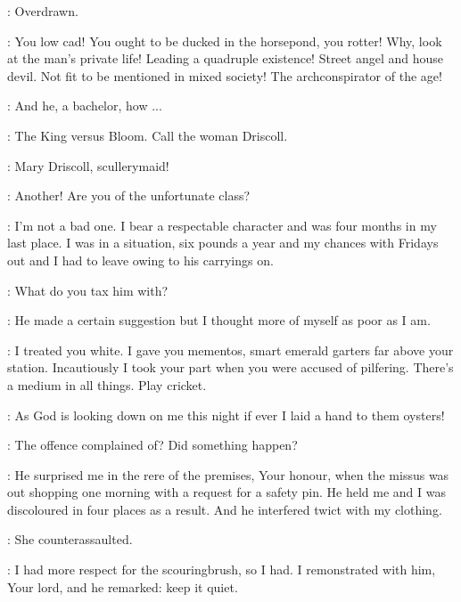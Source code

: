 \Bloom:
 Overdrawn.

\Beaufoy:
You low cad!
You ought to be ducked in the horsepond, you rotter!
Why, look at the man's private life!
Leading a quadruple existence!
Street angel and house devil.
Not fit to be mentioned in mixed society!
The archconspirator of the age!

\Bloom:
And he, a bachelor, how ...

\FirstWatch:
The King versus Bloom.
Call the woman Driscoll.

\Crier:
Mary Driscoll, scullerymaid!


\SecondWatch:
Another!
Are you of the unfortunate class?

\Driscoll:
I'm not a bad one.
I bear a respectable character and was four months in my last place.
I was in a situation, six pounds a year and my chances with Fridays out
and I had to leave owing to his carryings on.

\FirstWatch:
What do you tax him with?

\Driscoll:
He made a certain suggestion
but I thought more of myself as poor as I am.

\Bloom:
I treated you white.
I gave you mementos, smart emerald garters far above your station.
Incautiously I took your part when you were accused of pilfering.
There's a medium in all things.
Play cricket.

\Driscoll:
As God is looking down on me this night if ever I laid a hand to them oysters!

\FirstWatch:
The offence complained of?
Did something happen?

\Driscoll:
He surprised me in the rere of the premises, Your honour,
when the missus was out shopping one morning with a request for a safety pin.
He held me and I was discoloured in four places as a result.
And he interfered twict with my clothing.

\Bloom:
She counterassaulted.

\Driscoll:
I had more respect for the scouringbrush, so I had.
I remonstrated with him, Your lord, and he remarked:
keep it quiet.

